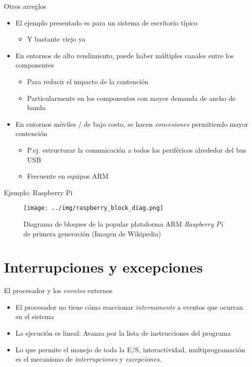 \documentclass[presentation]{beamer}
\begin{document}
\begin{frame}[label={sec:org0ba141a}]{Otros arreglos}
\begin{itemize}
\item El ejemplo presentado es para un sistema de escritorio típico
\begin{itemize}
\item Y bastante viejo ya
\end{itemize}
\item En entornos de alto rendimiento, puede haber múltiples canales entre
los componentes
\begin{itemize}
\item Para reducir el impacto de la contención
\item Particularmente en los componentes con mayor demanda de ancho de banda
\end{itemize}
\item En entornos móviles / de bajo costo, se hacen \emph{concesiones}
permitiendo mayor contención
\begin{itemize}
\item P.ej. estructurar la comunicación a todos los periféricos
alrededor del bus USB
\item Frecuente en equipos ARM
\end{itemize}
\end{itemize}
\end{frame}

\begin{frame}[label={sec:org396aa8e}]{Ejemplo: Raspberry Pi}
\begin{figure}[htbp]
\centering
\texttt{[image: ../img/raspberry\_block\_diag.png]}
\caption{Diagrama de bloques de la popular plataforma ARM \emph{Raspberry Pi} de primera generación (Imagen de Wikipedia)}
\end{figure}
\end{frame}

\section{Interrupciones y excepciones}
\label{sec:org237c592}

\begin{frame}[label={sec:orgaa4666b}]{El procesador y los \emph{eventos} externos}
\begin{itemize}
\item El procesador no tiene cómo reaccionar \emph{internamente} a eventos que
ocurran en el sistema
\item La ejecución es lineal: Avanza por la lista de instrucciones del
programa
\item Lo que permite el manejo de toda la E/S, interactividad,
multiprogramación es el mecanismo de \emph{interrupciones} y
\emph{excepciones}.
\end{itemize}
\end{frame}
\end{document}
